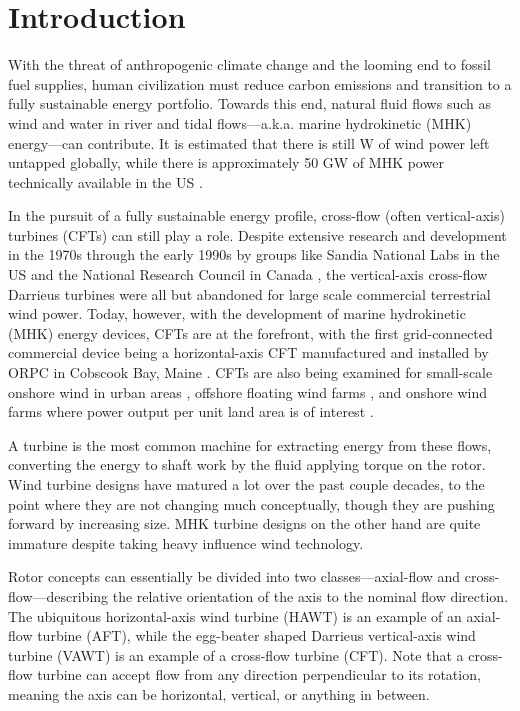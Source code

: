 \chapter{Introduction}

With the threat of anthropogenic climate change and the looming end to fossil
fuel supplies, human civilization must reduce carbon emissions \cite{Hansen2013}
and transition to a fully sustainable energy portfolio. Towards this end,
natural fluid flows such as wind and water in river and tidal flows---a.k.a.
marine hydrokinetic (MHK) energy---can contribute. It is estimated that there is
still  W of wind power
left untapped globally, while there is approximately 50 GW of MHK power
technically available in the US \cite{Haas2011, Jacobson2012, Haas2013}.



In the pursuit of a fully sustainable energy profile, cross-flow (often
vertical-axis) turbines (CFTs) can still play a role. Despite extensive research
and development in the 1970s through the early 1990s by groups like Sandia
National Labs in the US \cite{Sutherland2012} and the National Research Council
in Canada \cite{Para2002}, the vertical-axis cross-flow Darrieus turbines were
all but abandoned for large scale commercial terrestrial wind power. Today,
however, with the development of marine hydrokinetic (MHK) energy devices, CFTs
are at the forefront, with the first grid-connected commercial device being a
horizontal-axis CFT manufactured and installed by ORPC in Cobscook Bay, Maine
\cite{ORPC2012}. CFTs are also being examined for small-scale onshore wind in
urban areas \cite{Lott2015}, offshore floating wind farms \cite{Paulsen2011,
    Sandia2012}, and onshore wind farms where power output per unit land area is of
interest \cite{Dabiri2011}.



A turbine is the most common machine for extracting energy from these flows,
converting the energy to shaft work by the fluid applying torque on the rotor.
Wind turbine designs have matured a lot over the past couple decades, to the
point where they are not changing much conceptually, though they are pushing
forward by increasing size. MHK turbine designs on the other hand are quite
immature despite taking heavy influence wind technology.

Rotor concepts can essentially be divided into two classes---axial-flow and
cross-flow---describing the relative orientation of the axis to the nominal flow
direction. The ubiquitous horizontal-axis wind turbine (HAWT) is an example of
an axial-flow turbine (AFT), while the egg-beater shaped Darrieus vertical-axis
wind turbine (VAWT) is an example of a cross-flow turbine (CFT). Note that a
cross-flow turbine can accept flow from any direction perpendicular to its
rotation, meaning the axis can be horizontal, vertical, or anything in between.

